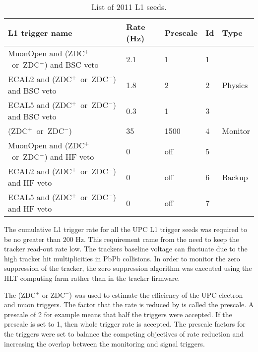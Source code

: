     \begin{table}[h]
      \centering
      \begin{tabular}{|l|l|l|l|l|}
        \hline L1 trigger name & Rate (Hz) & Prescale & Id & Type \\ \hline \hline
        MuonOpen and (ZDC$^{+}$~or~ZDC$^{-}$) and BSC veto & 2.1 & 1 & 1 & \multirow{3}{*}{Physics} \\  \hhline{----~}
        ECAL2 and (ZDC$^{+}$~or~ZDC$^{-}$) and BSC veto & 1.8 & 2 & 2 & \\  \hhline{----~}
        ECAL5 and (ZDC$^{+}$~or~ZDC$^{-}$) and BSC veto & 0.3 & 1 & 3 & \\  \hline
        (ZDC$^{+}$~or~ZDC$^{-}$) & 35 & 1500 & 4 & Monitor \\  \hline
        MuonOpen and (ZDC$^{+}$~or~ZDC$^{-}$) and HF veto & 0 & off & 5 & \multirow{3}{*}{Backup} \\ \hhline{----~}
        ECAL2 and (ZDC$^{+}$~or~ZDC$^{-}$) and HF veto & 0 & off & 6 & \\  \hhline{----~}
        ECAL5 and (ZDC$^{+}$~or~ZDC$^{-}$) and HF veto & 0 & off & 7 & \\  \hline
      \end{tabular}
      \caption{List of 2011 L1 seeds.}
      \label{tab:l1Triggers2011}
    \end{table}
    The cumulative L1 trigger rate for all the UPC L1 trigger seeds was
      required to be no greater than 200 Hz.
    This requirement came from the need to keep the tracker read-out rate
      low. 
    The trackers baseline voltage can fluctuate due to the high tracker hit 
      multiplicities in PbPb collisions.
    In order to monitor the zero suppression of the tracker, the zero 
      suppression algorithm was executed using the HLT computing farm 
	      rather than in the tracker firmware.

    The (ZDC$^{+}$ or ZDC$^{-}$) was used to estimate the efficiency of the UPC electron and muon triggers. 
    The factor that the rate is reduced by is called the prescale.
    A prescale of 2 for example means that half the triggers were 
      accepted.
    If the prescale is set to 1, then whole trigger rate is accepted. 
    The prescale factors for the triggers were set to balance the competing objectives 
      of rate reduction and increasing the overlap between the monitoring and
      signal triggers.

